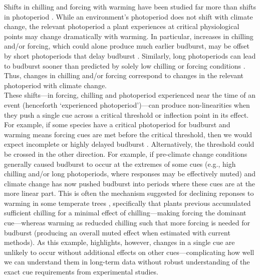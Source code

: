 \documentclass[11pt,letter]{article}
\begin{document}
Shifts in chilling and forcing with warming have been studied far more than shifts in photoperiod \citep[but see][]{saikkonen2012,way2015}. While an environment's photoperiod does not shift with climate change, the relevant photoperiod a plant experiences at critical physiological points may change dramatically with warming. In particular, increases in chilling and/or forcing, which could alone produce much earlier budburst, may be offset by short photoperiods that delay budburst \citep{gauzere2019}. Similarly, long photoperiods can lead to budburst sooner than predicted by solely low chilling or forcing conditions \citep{Nienstaedt:1966aa,Myking:1995,Partanen:1998aa}. Thus, changes in chilling and/or forcing correspond to changes in the relevant photoperiod with climate change. \\

These shifts---in forcing, chilling and photoperiod experienced near the time of an event (henceforth `experienced photoperiod')---can produce non-linearities when they push a single cue across a critical threshold or inflection point in its effect. For example, if some species have a critical photoperiod for budburst and warming means forcing cues are met before the critical threshold, then we would expect incomplete or highly delayed budburst \citep{Singh:2017,rinne2018}. Alternatively, the threshold could be crossed in the other direction. For example, if pre-climate change conditions generally caused budburst to occur at the extremes of some cues (e.g., high chilling and/or long photoperiods, where responses may be effectively muted) and climate change has now pushed budburst into periods where these cues are at the more linear part. This is often the mechanism suggested for declining reponses to warming in some temperate trees \citep{fu2015,piao2017,gauzere2019}, specifically that plants previous accumulated sufficient chilling for a minimal effect of chilling---making forcing the dominant cue---whereas warming as reducded chilling such that more forcing is needed for budburst (producing an overall muted effect when estimated with current methods). As this example, highlights, however, changes in a single cue are unlikely to occur without additional effects on other cues---complicating how well we can understand them in long-term data without robust understanding of the exact cue requirements from experimental studies.\\
\end{document}
